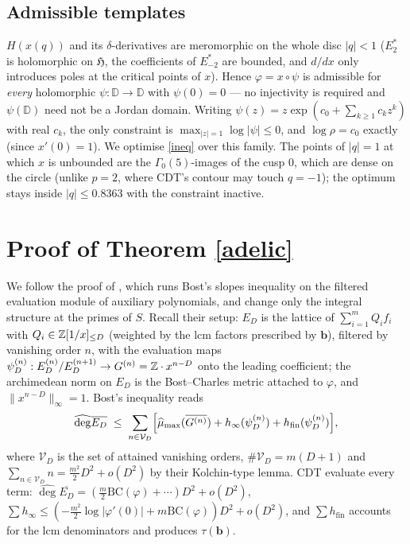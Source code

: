 \documentclass[11pt]{amsart}
\theoremstyle{remark}
\newcommand{\D}{\mathbb D}\newcommand{\T}{\mathbb T}\newcommand{\BC}{\mathrm{BC}}\newcommand{\RE}{\mathrm{RE}}
\newcommand{\adeg}{\widehat{\deg}}\newcommand{\amu}{\widehat{\mu}_{\max}}
\begin{document}
\subsection{Admissible templates}
$H(x(q))$ and its $\delta$-derivatives are meromorphic on the whole disc $|q|<1$ ($E_2^*$ is holomorphic on $\mathfrak H$, the coefficients of $E^*_{-2}$ are bounded, and $d/dx$ only introduces poles at the critical points of $x$). Hence $\varphi=x\circ\psi$ is admissible for \emph{every} holomorphic $\psi:\D\to\D$ with $\psi(0)=0$ --- no injectivity is required and $\psi(\D)$ need not be a Jordan domain. Writing $\psi(z)=z\exp(c_0+\sum_{k\ge1}c_kz^k)$ with real $c_k$, the only constraint is $\max_{|z|=1}\log|\psi|\le0$, and $\log\rho=c_0$ exactly (since $x'(0)=1$). We optimise \eqref{ineq} over this family. The points of $|q|=1$ at which $x$ is unbounded are the $\Gamma_0(5)$-images of the cusp $0$, which are dense on the circle (unlike $p=2$, where CDT's contour may touch $q=-1$); the optimum stays inside $|q|\le0.8363$ with the constraint inactive.

\section{Proof of Theorem \ref{adelic}}
We follow the proof of \cite[Thm.~\emph{main:BC form}, \S6.3]{CDTl2chi}, which runs Bost's slopes inequality \cite{Bost} on the filtered evaluation module of auxiliary polynomials, and change only the integral structure at the primes of $S$. Recall their setup: $E_D$ is the lattice of $\sum_{i=1}^mQ_if_i$ with $Q_i\in\mathbb Z[1/x]_{\le D}$ (weighted by the lcm factors prescribed by $\mathbf b$), filtered by vanishing order $n$, with the evaluation maps $\psi^{(n)}_D:E_D^{(n)}/E_D^{(n+1)}\to G^{(n)}=\mathbb Z\cdot x^{n-D}$ onto the leading coefficient; the archimedean norm on $E_D$ is the Bost--Charles metric attached to $\varphi$, and $\|x^{n-D}\|_\infty=1$. Bost's inequality reads
\begin{equation}\label{slopes}
\adeg\overline{E_D}\;\le\;\sum_{n\in\mathcal V_D}\Bigl[\amu(\overline{G^{(n)}})+h_\infty(\psi^{(n)}_D)+h_{\mathrm{fin}}(\psi^{(n)}_D)\Bigr],
\end{equation}
where $\mathcal V_D$ is the set of attained vanishing orders, $\#\mathcal V_D=m(D+1)$ and $\sum_{n\in\mathcal V_D}n=\tfrac{m^2}2D^2+o(D^2)$ by their Kolchin-type lemma. CDT evaluate every term: $\adeg\overline{E_D}=(\tfrac m2\BC(\varphi)+\cdots)D^2+o(D^2)$, $\sum h_\infty\le(-\tfrac{m^2}2\log|\varphi'(0)|+m\BC(\varphi))D^2+o(D^2)$, and $\sum h_{\mathrm{fin}}$ accounts for the lcm denominators and produces $\tau(\mathbf b)$.
\end{document}
